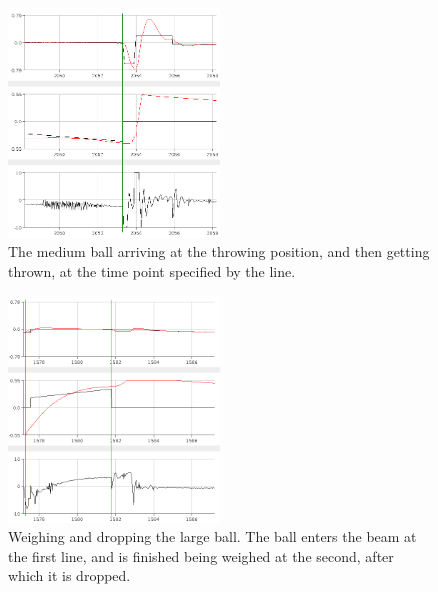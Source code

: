 \begin{figure}[h]
\centering
\includegraphics[width=0.5\textwidth]{figures/throwmediumball-crop.png}
\caption{The medium ball arriving at the throwing position, and then getting thrown, at the time point specified by the line.}
\label{fig:throwmediumball}
\end{figure}

\begin{figure}[h]
\centering
\includegraphics[width=0.5\textwidth]{figures/weighanddroplargeball-crop.png}
\caption{Weighing and dropping the large ball. The ball enters the beam at the first line, and is finished being weighed at the second, after which it is dropped.}
\label{fig:weighbandthrowlargeball}
\end{figure}




